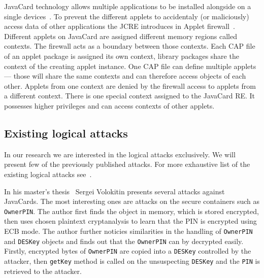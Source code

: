 \documentclass{../llncs/llncs}
\begin{document}
    JavaCard technology allows multiple applications to be installed alongside on a single devices~\cite{jcspecs31download}. To prevent the different applets to accidentaly (or maliciously) access data of other applications the JCRE introduces in Applet firewall~\cite{jcspecs31download}. Different applets on JavaCard are assigned different memory regions called contexts. The firewall acts as a boundary between those contexts. Each CAP file of an applet package is assigned its own context, library packages share the context of the creating applet instance. One CAP file can define multiple applets --- those will share the same contexts and can therefore access objects of each other. Applets from one context are denied by the firewall access to applets from a different context.
    There is one special context assigned to the JavaCard RE. It possesses higher privileges and can access contexts of other applets.


    \subsection{Existing logical attacks}
    In our research we are interested in the logical attacks exclusively. We will present few of the previously published attacks. For more exhaustive list of the existing logical attacks see~\cite{anon2020thesis,sergei,se:oracle:part1,se:oracle:part2,se:oracle:part3}.

    In his master's thesis~\cite{sergei} Sergei Volokitin presents several attacks against JavaCards.
    The most interesting ones are attacks on the secure containers such as \texttt{OwnerPIN}. The author first finds the object in memory, which is stored encrypted, then uses chosen plaintext cryptanalysis to learn that the PIN is encrypted using ECB mode. The author further noticies similarities in the handling of \texttt{OwnerPIN} and \texttt{DESKey} objects and finds out that the \texttt{OwnerPIN} can by decrypted easily. Firstly, encrypted bytes of \texttt{OwnerPIN} are copied into a \texttt{DESKey} controlled by the attacker, then \texttt{getKey} method is called on the unsuspecting \texttt{DESKey} and the \texttt{PIN} is retrieved to the attacker.
\end{document}

